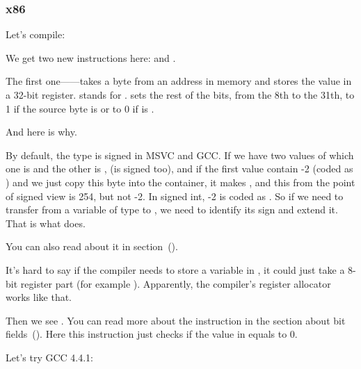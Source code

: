 \subsubsection{x86}


Let's compile:




We get two new instructions here: \MOVSX and \TEST.

\label{MOVSX}

The first one---\MOVSX---takes a byte from an address in memory and stores the value in a 32-bit register. 
\MOVSX stands for . 
\MOVSX sets the rest of the bits, from the 8th to the 31th, 
to 1 if the source byte is  or to 0 if is .

And here is why.

By default, the \Tchar type is signed in MSVC and GCC. If we have two values of which one is \Tchar 
and the other is \Tint, (\Tint is signed too), and if the first value contain -2 (coded as ) 
and we just copy this byte into the \Tint container, it makes , and this 
from the point of signed \Tint view is 254, but not -2. In signed int, -2 is coded as . 
So if we need to transfer  from a variable of \Tchar type to \Tint, 
we need to identify its sign and extend it. That is what \MOVSX does.

You can also read about it in \q{\IT{\SignedNumbersSectionName}} section~().

It's hard to say if the compiler needs to store a \Tchar variable in \EDX, it could just take a 8-bit register part 
(for example \DL). Apparently, the compiler's \gls{register allocator} works like that.


Then we see . 
You can read more about the \TEST instruction in the section about bit fields~().
Here this instruction just checks if the value in \EDX equals to 0.


Let's try GCC 4.4.1:



